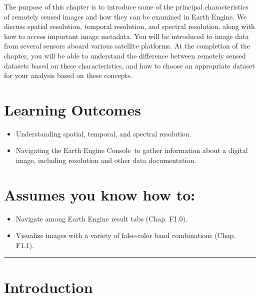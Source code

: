 \documentclass[
  letterpaper,
  DIV=11,
  numbers=noendperiod]{scrreprt}
\providecommand{\tightlist}{%
  \setlength{\itemsep}{0pt}\setlength{\parskip}{0pt}}\usepackage{longtable,booktabs,array}
\begin{document}
The purpose of this chapter is to introduce some of the principal
characteristics of remotely sensed images and how they can be examined
in Earth Engine. We discuss spatial resolution, temporal resolution, and
spectral resolution, along with how to access important image metadata.
You will be introduced to image data from several sensors aboard various
satellite platforms. At the completion of the chapter, you will be able
to understand the difference between remotely sensed datasets based on
these characteristics, and how to choose an appropriate dataset for your
analysis based on these concepts. ~

\hypertarget{learning-outcomes-3}{%
\section*{Learning Outcomes}\label{learning-outcomes-3}}


\begin{itemize}
\tightlist
\item
  Understanding spatial, temporal, and spectral resolution.
\item
  Navigating the Earth Engine Console~to gather information about a
  digital image, including resolution and other data documentation.
\end{itemize}

\hypertarget{assumes-you-know-how-to-3}{%
\section*{Assumes you know how to:}\label{assumes-you-know-how-to-3}}


\begin{itemize}
\tightlist
\item
  Navigate among Earth Engine result tabs (Chap. F1.0).
\item
  Visualize images with a variety of false-color band combinations
  (Chap. F1.1).
\end{itemize}

\begin{center}\rule{0.5\linewidth}{0.5pt}\end{center}

\hypertarget{introduction-2}{%
\section*{Introduction}\label{introduction-2}}
\end{document}
